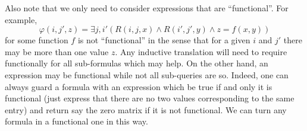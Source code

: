 Also note that we only need to consider expressions that are ``functional''. For example,
$$
\varphi(i,j',z)=\exists j,i' ( R(i,j,x)\land R(i',j',y)\land z=f(x,y))
$$
for some function $f$ is not ``functional'' in the sense that for a given $i$ and $j'$ there may be more than one value $z$. Any inductive translation will need to require functionally for all sub-formulas
which  may help. On the other hand, an expression may be functional while not all sub-queries are so. Indeed, one can always guard a formula with an expression which be true if and only it is functional
(just express that there are no two values corresponding to the same entry) and return say the zero matrix if it is not functional. We can turn any formula in a functional one in this way.










